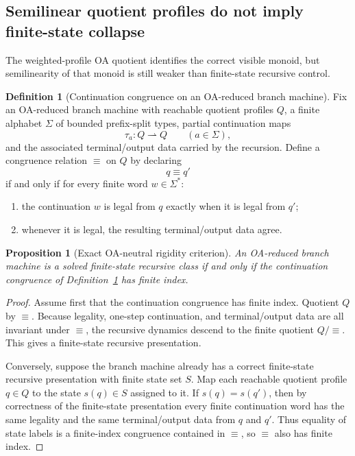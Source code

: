 \documentclass[11pt]{article}
\newtheorem{proposition}[theorem]{Proposition}
\theoremstyle{definition}
\newtheorem{definition}[theorem]{Definition}
\newcommand{\1}{\mathbf{1}}
\begin{document}
\subsection*{Semilinear quotient profiles do not imply finite-state collapse}
The weighted-profile OA quotient identifies the correct visible monoid, but semilinearity of that monoid is still weaker than finite-state recursive control.

\begin{definition}[Continuation congruence on an OA-reduced branch machine]\label{def:oa-continuation-congruence}
Fix an OA-reduced branch machine with reachable quotient profiles $Q$, a finite alphabet $\Sigma$ of bounded prefix-split types, partial continuation maps
\[
\tau_a:Q\rightharpoonup Q
\qquad (a\in \Sigma),
\]
and the associated terminal/output data carried by the recursion.
Define a congruence relation $\equiv$ on $Q$ by declaring
\[
q\equiv q'
\]
if and only if for every finite word $w\in \Sigma^\ast$:
\begin{enumerate}[label=(\roman*),leftmargin=2.2em]
\item the continuation $w$ is legal from $q$ exactly when it is legal from $q'$;
\item whenever it is legal, the resulting terminal/output data agree.
\end{enumerate}
\end{definition}

\begin{proposition}[Exact OA-neutral rigidity criterion]\label{prop:oa-continuation-criterion}
An OA-reduced branch machine is a solved finite-state recursive class if and only if the continuation congruence of Definition~\ref{def:oa-continuation-congruence} has finite index.
\end{proposition}

\begin{proof}
Assume first that the continuation congruence has finite index.
Quotient $Q$ by $\equiv$.
Because legality, one-step continuation, and terminal/output data are all invariant under $\equiv$, the recursive dynamics descend to the finite quotient $Q/{\equiv}$.
This gives a finite-state recursive presentation.

Conversely, suppose the branch machine already has a correct finite-state recursive presentation with finite state set $S$.
Map each reachable quotient profile $q\in Q$ to the state $s(q)\in S$ assigned to it.
If $s(q)=s(q')$, then by correctness of the finite-state presentation every finite continuation word has the same legality and the same terminal/output data from $q$ and $q'$.
Thus equality of state labels is a finite-index congruence contained in $\equiv$, so $\equiv$ also has finite index.
\end{proof}
\end{document}

